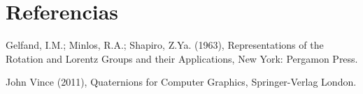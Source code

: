 \documentclass{article}
\theoremstyle{plain}
\theoremstyle{definition}
\theoremstyle{remark}
\begin{document}
\section{Referencias}

\begin{thebibliography}{9}

  Gelfand, I.M.; Minlos, R.A.; Shapiro, Z.Ya. (1963),
  Representations of the Rotation and Lorentz Groups and their Applications,
  New York: Pergamon Press.

  John Vince (2011),
  Quaternions for Computer Graphics,
  Springer-Verlag London.
  
\end{thebibliography}
\end{document}
